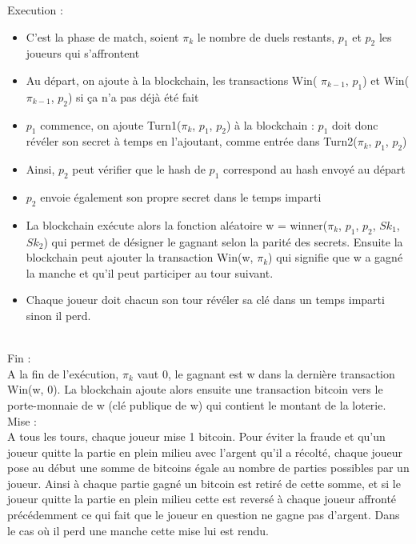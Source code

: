 \documentclass[conference]{IEEEtran}
\begin{document}
Execution :  \\
\begin{itemize}
\item C'est la phase de match, soient $\pi_{k}$ le nombre de duels restants, $p_{1}$ et $p_{2}$ les joueurs qui s'affrontent
\item Au départ, on ajoute à la blockchain, les transactions Win( $\pi_{k-1}$, $p_{1}$) et Win( $\pi_{k-1}$, $p_{2}$) si ça n'a pas déjà été fait
\item $p_{1}$ commence, on ajoute Turn1($\pi_{k}$, $p_{1}$, $p_{2}$) à la blockchain :  $p_{1}$ doit donc révéler son secret à temps en l'ajoutant, comme entrée dans Turn2($\pi_{k}$, $p_{1}$, $p_{2}$)
\item Ainsi, $p_{2}$ peut vérifier que le hash de $p_{1}$ correspond au hash envoyé au départ
\item $p_{2}$ envoie également son propre secret dans le temps imparti
\item La blockchain exécute alors la fonction aléatoire w = winner($\pi_{k}$, $p_{1}$, $p_{2}$, $Sk_{1}$, $Sk_{2}$) qui permet de désigner le gagnant selon la parité des secrets. Ensuite la blockchain peut ajouter la transaction Win(w, $\pi_{k}$) qui signifie que w a gagné la manche et qu'il peut participer au tour suivant.
\item Chaque joueur doit chacun son tour révéler sa clé dans un temps imparti sinon il perd. \\
\end{itemize}\\

Fin :\\
A la fin de l'exécution, $\pi_{k}$ vaut 0, le gagnant est w dans la dernière transaction Win(w, 0). La blockchain ajoute alors ensuite une transaction bitcoin vers le porte-monnaie de w (clé publique de w) qui contient le montant de la loterie.\\

Mise : \\
 A tous les tours, chaque joueur mise 1 bitcoin. Pour éviter la fraude et qu'un joueur quitte la partie en plein milieu avec l'argent qu'il a récolté, chaque joueur pose au début une somme de bitcoins égale au nombre de parties possibles par un joueur. Ainsi à chaque partie gagné un bitcoin est retiré de cette somme, et si le joueur quitte la partie en plein milieu cette est reversé à chaque joueur affronté précédemment ce qui fait que le joueur en question ne gagne pas d'argent. Dans le cas où il perd une manche cette mise lui est rendu.
\end{document}
